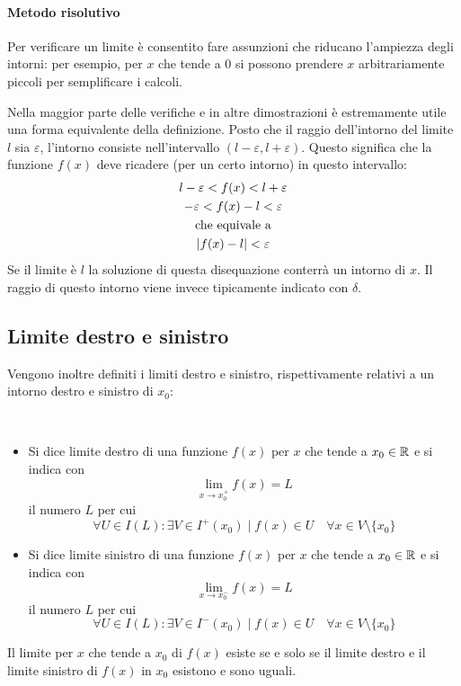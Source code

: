 \paragraph{Metodo risolutivo}
\label{lim:metodo}
Per verificare un limite è consentito fare assunzioni che riducano l'ampiezza degli intorni: per esempio, per $x$ che tende a $0$ si possono prendere $x$ arbitrariamente piccoli per semplificare i calcoli.

Nella maggior parte delle verifiche e in altre dimostrazioni è estremamente utile una forma equivalente della definizione. Posto che il raggio dell'intorno del limite $l$ sia $\varepsilon$, l'intorno consiste nell'intervallo $(l-\varepsilon,l+\varepsilon)$. Questo significa che la funzione $f(x)$ deve ricadere (per un certo intorno) in questo intervallo:
\begin{gather*}
	l-\varepsilon<f(x)<l+\varepsilon\\
	-\varepsilon<f(x)-l<\varepsilon\\
	\text{che equivale a}\\
	\left\lvert f(x)-l \right\rvert<\varepsilon
\end{gather*}
Se il limite è $l$ la soluzione di questa disequazione conterrà un intorno di $x$. Il raggio di questo intorno viene invece tipicamente indicato con $\delta$.


\subsection{Limite destro e sinistro}
Vengono inoltre definiti i limiti destro e sinistro, rispettivamente relativi a un intorno destro e sinistro di $x_0$:
\begin{defin}
	~
	\begin{itemize}
		\item Si dice limite destro di una funzione $f(x)$ per $x$ che tende a $x_0\in\mathbb{R}$ e si indica con
		      \[
			      \lim_{x\to x_0^+} f(x)=L
		      \]
		      il numero $L$ per cui
		      \[
			      \forall U\in I(L): \exists V\in I^+(x_0)\mid f(x)\in U \quad\forall x\in V\setminus\{x_0\}
		      \]
		\item Si dice limite sinistro di una funzione $f(x)$ per $x$ che tende a $x_0\in\mathbb{R}$ e si indica con
		      \[
			      \lim_{x\to x_0^-} f(x)=L
		      \]
		      il numero $L$ per cui
		      \[
			      \forall U\in I(L): \exists V\in I^-(x_0)\mid f(x)\in U \quad\forall x\in V\setminus\{x_0\}
		      \]
	\end{itemize}
	Il limite per $x$ che tende a $x_0$ di $f(x)$ esiste se e solo se il limite destro e il limite sinistro di $f(x)$ in $x_0$ esistono e sono uguali.
\end{defin}
